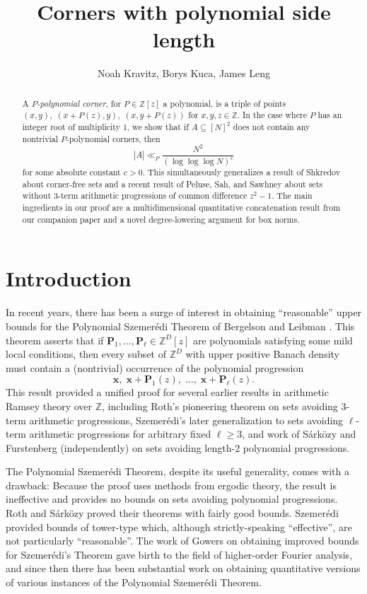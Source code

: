 \documentclass[11pt]{amsart}
\title[]{Corners with polynomial side length}
\author{Noah Kravitz, Borys Kuca, James Leng}
\date{}
\theoremstyle{definition}
\newcommand{\Z}{{\mathbb Z}}
\newcommand{\bx}{{\textbf{x}}}
\begin{document}
\maketitle

\begin{abstract}
A \emph{$P$-polynomial corner}, for $P \in \mathbb{Z}[z]$ a polynomial, is a triple of points $(x,y),\; (x+P(z),y),\; (x,y+P(z))$ for $x,y,z \in \mathbb{Z}$.  In the case where $P$ has an integer root of multiplicity $1$, we show that if $A \subseteq [N]^2$ does not contain any nontrivial $P$-polynomial corners, then $$|A| \ll_P \frac{N^2}{(\log\log\log N)^c}$$ for some absolute constant $c>0$.  This simultaneously generalizes a result of Shkredov about corner-free sets and a recent result of Peluse, Sah, and Sawhney about sets without $3$-term arithmetic progressions of common difference $z^2-1$.  The main ingredients in our proof are a multidimensional quantitative concatenation result from our companion paper \cite{KKL24a} and a novel degree-lowering argument for box norms.
\end{abstract}


\section{Introduction}

 


In recent years, there has been a surge of interest in obtaining ``reasonable'' upper bounds for the Polynomial Szemer\'edi Theorem of Bergelson and Leibman \cite{BL96}. 
This theorem asserts that if $\mathbf{P}_1, \ldots, \mathbf{P}_\ell \in \Z^D[z]$ are polynomials satisfying some mild local conditions, then every subset of $\Z^D$ with upper positive Banach density must contain a (nontrivial) occurrence of the polynomial progression 
$$\bx,\; \bx+\mathbf{P}_1(z),\; \ldots,\; \bx+\mathbf{P}_\ell(z).$$
This result provided a unified proof for several earlier results in arithmetic Ramsey theory over $\Z$, including Roth's pioneering theorem \cite{R53} on sets avoiding $3$-term arithmetic progressions, Szemer\'edi's later generalization \cite{Sz75} to sets avoiding $\ell$-term arithmetic progressions for arbitrary fixed $\ell \geq 3$, and work of S\'ark\"ozy \cite{Sa78a,Sa78b} and Furstenberg \cite{Fu77} (independently) on sets avoiding length-$2$ polynomial progressions.

The Polynomial Szemer\'edi Theorem, despite its useful generality, comes with a drawback: Because the proof uses methods from ergodic theory, the result is ineffective and provides no  bounds on sets avoiding polynomial progressions.  Roth and S\'ark\"ozy proved their theorems with fairly good bounds.  Szemer\'edi provided bounds of tower-type which, although strictly-speaking ``effective'', are not particularly ``reasonable''.  The work of Gowers on obtaining improved bounds for Szemer\'edi's Theorem \cite{Go98a, Go01} gave birth to the field of higher-order Fourier analysis, and since then there has been substantial work on obtaining quantitative versions of various instances of the Polynomial Szemer\'edi Theorem.
\end{document}
